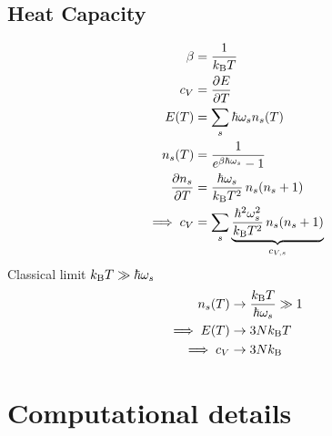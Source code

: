 \newpage

\section{Heat Capacity}
\begin{subequations}
\begin{align}
	\beta
		& = \frac{1}{k_{\rm B} T} \\
	c_V 
		&= \frac{\partial E}{\partial T} \\
	E (T)
		&= \sum_s \hbar \omega_s n_s (T) \\
	n_s (T)
		&= \frac{1}{e^{\beta \hbar \omega_s} - 1} \\
	\frac{\partial n_s}{\partial T}
		&= \frac{\hbar \omega_s}{k_{\rm B} T^2} \, n_s (n_s + 1) \\
	\implies c_V
		&= \sum_s \underset{c_{V, s}}{\underbrace{\frac{\hbar^2 \omega_s^2}{k_{\rm B} T^2} \, n_s (n_s + 1)}}
\end{align}
\end{subequations}
Classical limit $k_{\rm B} T \gg \hbar \omega_s$
\begin{subequations}
\begin{align}
	n_s (T) 
		&\to \frac{k_{\rm B} T}{\hbar \omega_s} \gg 1 \\
	\implies E(T)
		&\to 3 N k_{\rm B} T \\
	\implies c_V 
		&\to 3 N k_{\rm B}
\end{align}
\end{subequations}

\chapter{Computational details}
\label{sec:app.computational_details}
